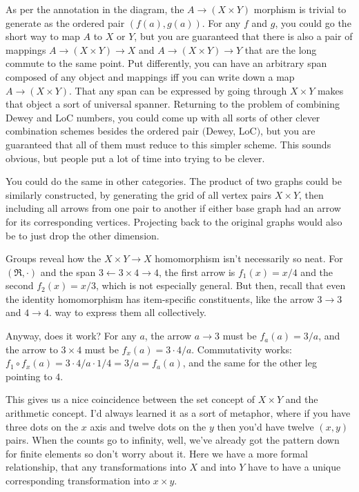 \documentclass[11pt]{article}
\begin{document}
As per the annotation in the diagram, the $A\to (X\times Y)$ morphism is trivial to generate as
the ordered pair $(f(a), g(a))$.  For any $f$ and $g$, you could go the short way to
map $A$ to $X$ or $Y$, but you are guaranteed that there is also a pair of mappings
$A\to (X\times Y) \to X$ and $A\to (X\times Y) \to Y$ that are the long commute to the
same point.  Put differently, you can have an arbitrary span composed of any object and
mappings iff you can write down a map $A\to (X\times Y)$. That any span can be expressed
by going through $X\times Y$ makes that object a sort of universal spanner. Returning
to the problem of combining Dewey and LoC numbers, you could come up with all sorts
of other clever combination schemes besides the ordered pair $($Dewey, LoC$)$, but
you are guaranteed that all of them must reduce to this simpler scheme. This sounds
obvious, but people put a lot of time into trying to be clever.

You could do the same in other categories. The product of two graphs could be similarly
constructed, by generating the grid of all vertex pairs $X\times Y$, then including all
arrows from one pair to another if either base graph had an arrow for its corresponding
vertices. Projecting back to the original graphs would also be to just drop the other
dimension.

Groups reveal how the $X\times Y \to X$ homomorphism isn't
necessarily so neat. For $(\Re, \cdot)$ and the span $3 \leftarrow 3\times 4 \rightarrow 4$, the
first arrow is $f_1(x)=x/4$ and the second $f_2(x)=x/3$, which is not especially general.
But then, recall that even the identity homomorphism has item-specific constituents, like the arrow $3\to 3$ and $4\to
4$.
way to express them all collectively.

Anyway, does it work? For any $a$, the arrow $a\to 3$ must be $f_a(a)=3/a$, and the arrow to
$3\times 4$ must be $f_{x}(a)=3\cdot 4/a$. Commutativity works: $f_1\circ f_x(a) = 3\cdot
4/a\cdot 1/4 = 3/a = f_a(a)$, and the same for the other leg pointing to $4$.

This gives us a nice coincidence between the set concept of $X\times Y$ and the arithmetic
concept. I'd always learned it as a sort of metaphor, where if you have three dots on the
$x$ axis and twelve dots on the $y$ then you'd have twelve $(x,y)$ pairs. When the counts
go to infinity, well, we've already got the pattern down for finite elements so don't
worry about it. Here we have a more formal relationship, that any transformations into $X$
and into $Y$ have to have a unique corresponding transformation into $x\times y$.
\end{document}
